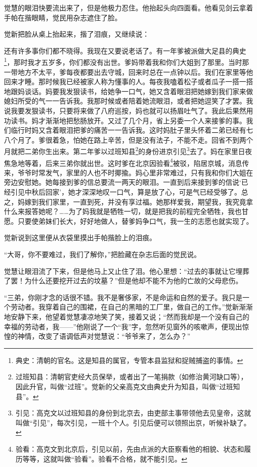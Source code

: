 \par 觉慧的眼泪快要流出来了，但是他极力忍住。他抬起头向四面看。他看见剑云拿着手帕在揩眼睛，觉民用杂志遮住了脸。
\par 觉新把脸从桌上抬起来，揩了泪痕，又继续说：
\par 还有许多事你们都不晓得。我现在又要说老话了。有一年爹被派做大足县的典史\footnote{典史：清朝的官名。这是知县的属官，专管本县监狱和捉贼捕盗的事情。}，那时我才五岁多，你们都没有出世。爹妈带着我和你们大姐到了那里。当时那一带地方不太平，爹每夜都要出去守城，回来时总在一点钟以后。我们在家里等他回来才睡。那时候我已经被家人称为懂事的人。每夜我嗑着松子或者瓜子一搭一搭地跟妈谈话。妈要我发狠读书，给她争一口气，她又含着眼泪把她嫁到我们家来做媳妇所受的气一一告诉我。我那时候或者陪着她流眼泪，或者把她逗笑了才罢。我说我要发狠读书，只要将来做了八府巡按，妈也就可以扬眉吐气了。我此后果然用功读书。妈才渐渐地把愁肠放开。又过了几个月，省上另委一个人来接爹的事。我们临行时妈又含着眼泪把爹的痛苦一一告诉我。这时妈肚子里头怀着二弟已经有七八个月了。爹很着急，怕她在路上辛苦，但是没有法子，不能不走。回省不到两个月就把二弟你生出来。第二年爹以过班知县\footnote{过班知县：清朝官吏经大员保举，或者出了一笔捐款（如修治黄河缺口等），因此升官，叫做“过班”。觉新的父亲高克文由典史升为知县，叫做“过班知县”。}的身份进京引见\footnote{引见：高克文以过班知县的身份到北京去，由吏部主事带领他去见皇帝，这就叫做“引见”，每次引见，一班十个人。引见后便可以领照出京，听候补缺了。}去了。妈在家里日夜焦急地等着，后来三弟你就出世。这时爹在北京因验看\footnote{验看：高克文到北京后，引见以前，先由点派的大臣察看他的相貌、状态和履历等等，这就叫做“验看”。验看不合格，就不能引见。}被驳，陷居京城，消息传来，爷爷时常发气，家里的人也不时揶揄。妈心里非常难过，只有我和你们大姐在旁边安慰她。她每接到爹的信总要流一两天的眼泪。一直到后来接到爹的信说‘已经引见中秋后回家’，她才深深地叹一口气，算是放了心，可是气已经受够了。总之，妈嫁到我们家里，一直到死，并没有享过福。她那样爱我，期望我，我究竟拿什么来报答她呢？……为了妈我就是牺牲一切，就是把我的前程完全牺牲，我也甘愿。只要使弟妹们长大，好好地做人，替爹妈争口气，我一生的志愿也就实现了。
\par 觉新说到这里便从衣袋里摸出手帕揩脸上的泪痕。
\par “大哥，你不要难过，我们了解你，”把脸藏在杂志后面的觉民说。
\par 觉慧让眼泪流了下来，但是他马上又止住了泪。他心里想：“过去的事就让它埋葬了罢！为什么还要挖开过去的坟墓？”但是他却不能不为他的亡故的父母悲伤。
\par “三弟，你刚才念的话很不错。我不是奢侈家，不是命运和自然的爱子。我只是一个劳动者。我穿着自己的围裙，在自己的黑暗的工厂里，做自己的工作。”觉新渐渐地安静下来，他望着觉慧凄凉地笑了笑，接着又说；“然而我却是一个没有自己的幸福的劳动者，我——”他刚说了一个“我”字，忽然听见窗外的咳嗽声，便现出惊惶的神情，改变了语调低声对觉慧说：“爷爷来了，怎么办？”
